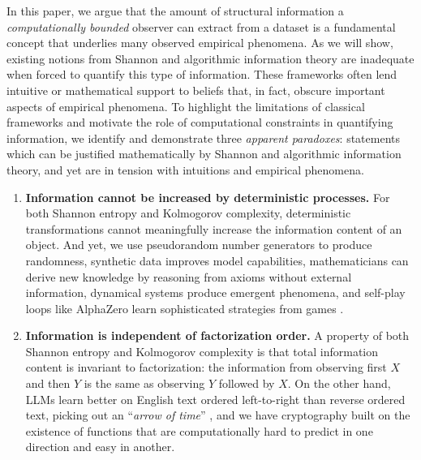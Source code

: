 \documentclass[twoside]{article}
\begin{document}
In this paper, we argue that the amount of structural information a \emph{computationally bounded} observer can extract from a dataset is a fundamental concept that underlies many observed empirical phenomena. 
%
As we will show, existing notions from Shannon and algorithmic information theory are inadequate when forced to quantify this type of information.
These frameworks often lend intuitive or mathematical support to beliefs that, in fact, obscure important aspects of empirical phenomena. To highlight the limitations of classical frameworks and motivate the role of computational constraints in quantifying information, we identify and demonstrate three \emph{apparent paradoxes}: statements which can be justified mathematically by Shannon and algorithmic information theory, and yet are in tension with intuitions and empirical phenomena. %
%
%
\begin{enumerate}
[
    label=Paradox~\arabic*:,
    leftmargin=3em,
    labelsep=0.5em,
    align=left
]

    \item \textbf{Information cannot be increased by deterministic processes.}
    For both Shannon entropy and Kolmogorov complexity, deterministic transformations cannot meaningfully increase the information content of an object. And yet, we use pseudorandom number generators to produce randomness, synthetic data improves model capabilities, mathematicians can derive new knowledge by reasoning from axioms without external information, dynamical systems produce emergent phenomena, and self-play loops like AlphaZero learn sophisticated strategies from games \citep{silver2018general}. %
    \item \textbf{Information is independent of factorization order.} A property of both Shannon entropy and Kolmogorov complexity is that total information content is invariant to factorization: the information from observing first $X$ and then $Y$ is the same as observing $Y$ followed by $X$. On the other hand, LLMs learn better on English text ordered left-to-right than reverse ordered text, picking out an ``\emph{arrow of time}'' \citep{papadopoulos2024arrows, bengio2019meta}, and we have cryptography built on the existence of functions that are computationally hard to predict in one direction and easy in another. 


\end{enumerate}
\end{document}
